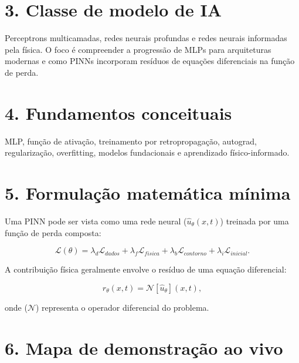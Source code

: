 \documentclass[
  brazilian,
  a4paper,
  DIV=11,
  numbers=noendperiod]{scrreprt}
\begin{document}
\section{3. Classe de modelo de IA}\label{classe-de-modelo-de-ia}

Perceptrons multicamadas, redes neurais profundas e redes neurais
informadas pela física. O foco é compreender a progressão de MLPs para
arquiteturas modernas e como PINNs incorporam resíduos de equações
diferenciais na função de perda.

\section{4. Fundamentos conceituais}\label{fundamentos-conceituais}

MLP, função de ativação, treinamento por retropropagação, autograd,
regularização, overfitting, modelos fundacionais e aprendizado
físico-informado.

\section{5. Formulação matemática
mínima}\label{formulauxe7uxe3o-matemuxe1tica-muxednima}

Uma PINN pode ser vista como uma rede neural (\(\hat{u}_\theta(x,t)\))
treinada por uma função de perda composta:

\[
\mathcal{L}(\theta) =
\lambda_d \mathcal{L}_{dados} +
\lambda_f \mathcal{L}_{fisica} +
\lambda_b \mathcal{L}_{contorno} +
\lambda_i \mathcal{L}_{inicial}.
\]

A contribuição física geralmente envolve o resíduo de uma equação
diferencial:

\[
r_\theta(x,t) = \mathcal{N}[\hat{u}_\theta](x,t),
\]

onde (\(\mathcal{N}\)) representa o operador diferencial do problema.

\section{6. Mapa de demonstração ao
vivo}\label{mapa-de-demonstrauxe7uxe3o-ao-vivo}
\end{document}
